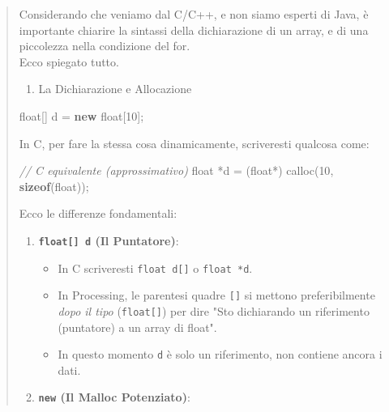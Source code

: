 \documentclass[
]{article}
\newenvironment{Shaded}{}{}
\newcommand{\CommentTok}[1]{\textcolor[rgb]{0.38,0.63,0.69}{\textit{#1}}}
\newcommand{\DataTypeTok}[1]{\textcolor[rgb]{0.56,0.13,0.00}{#1}}
\newcommand{\DecValTok}[1]{\textcolor[rgb]{0.25,0.63,0.44}{#1}}
\newcommand{\KeywordTok}[1]{\textcolor[rgb]{0.00,0.44,0.13}{\textbf{#1}}}
\newcommand{\NormalTok}[1]{#1}
\newcommand{\OperatorTok}[1]{\textcolor[rgb]{0.40,0.40,0.40}{#1}}
\begin{document}
\begin{quote}
Considerando che veniamo dal C/C++, e non siamo esperti di Java, è
importante chiarire la sintassi della dichiarazione di un array, e di
una piccolezza nella condizione del for.\\
Ecco spiegato tutto.

\begin{enumerate}
\def\labelenumi{\arabic{enumi}.}
\item
  La Dichiarazione e Allocazione
\end{enumerate}

\begin{Shaded}
\begin{Highlighting}[]
\DataTypeTok{float}\OperatorTok{[]}\NormalTok{ d }\OperatorTok{=} \KeywordTok{new} \DataTypeTok{float}\OperatorTok{[}\DecValTok{10}\OperatorTok{];}
\end{Highlighting}
\end{Shaded}

In C, per fare la stessa cosa dinamicamente, scriveresti qualcosa come:

\begin{Shaded}
\begin{Highlighting}[]
\CommentTok{// C equivalente (approssimativo)}
\DataTypeTok{float} \OperatorTok{*}\NormalTok{d }\OperatorTok{=} \OperatorTok{(}\DataTypeTok{float}\OperatorTok{*)}\NormalTok{ calloc}\OperatorTok{(}\DecValTok{10}\OperatorTok{,} \KeywordTok{sizeof}\OperatorTok{(}\DataTypeTok{float}\OperatorTok{));}
\end{Highlighting}
\end{Shaded}

Ecco le differenze fondamentali:

\begin{enumerate}
\def\labelenumi{\arabic{enumi}.}
\item
  \textbf{\texttt{float{[}{]}\ d} (Il Puntatore)}:

  \begin{itemize}
  \item
    In C scriveresti \texttt{float\ d{[}{]}} o \texttt{float\ *d}.
  \item
    In Processing, le parentesi quadre \texttt{{[}{]}} si mettono
    preferibilmente \emph{dopo il tipo} (\texttt{float{[}{]}}) per dire
    "Sto dichiarando un riferimento (puntatore) a un array di float".
  \item
    In questo momento \texttt{d} è solo un riferimento, non contiene
    ancora i dati.
  \end{itemize}
\item
  \textbf{\texttt{new} (Il Malloc Potenziato)}:


\end{enumerate}
\end{quote}
\end{document}
